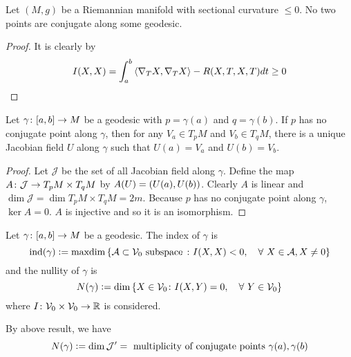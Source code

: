 \begin{enumerate}[label=\arabic{*}.]
	\begin{cor}
		Let $(M,g)$ be a Riemannian manifold with sectional curvature $\leq 0$. No two points are conjugate along some geodesic.
	\end{cor}
	\begin{proof}
		It is clearly by
		\begin{equation*}
			I(X,X) = \int_a^b \left\langle \nabla_TX,\nabla_T X \right\rangle - R(X,T,X,T)dt \geq 0
		\end{equation*}
	\end{proof}	
	\begin{lem}\label{lem:jacofixpt}
		Let $\gamma \colon [a,b] \rightarrow M$ be a geodesic with $p = \gamma(a)$ and $q = \gamma(b)$. If $p$ has no conjugate point along $\gamma$, then for any $V_a \in T_pM$ and $V_b \in T_qM$, there is a unique Jacobian field $U$ along $\gamma$ such that $U(a) = V_a$ and $U(b) = V_b$.
	\end{lem}
	\begin{proof}
		Let $\mathcal{J}$ be the set of all Jacobian field along $\gamma$. Define the map $A \colon \mathcal{J} \rightarrow T_pM \times T_qM$ by $A(U) = \left(U(a),U(b)\right)$. Clearly $A$ is linear and $\dim \mathcal{J} = \dim T_pM \times T_qM = 2m$. Because $p$ has no conjugate point along $\gamma$, $\ker A = 0$. $A$ is injective and so it is an isomorphism.
	\end{proof}

	\begin{defn}
		Let $\gamma \colon [a,b] \rightarrow M$ be a geodesic. The index of $\gamma$ is 
		\begin{equation*}
			\operatorname{ind}(\gamma) \vcentcolon= \operatorname{maxdim}\left\{\mathcal{A} \subset \mathcal{V}_0 \text{ subspace } \colon I(X,X) < 0,\quad \forall~X \in \mathcal{A},X\neq 0\right\}
		\end{equation*}
		and the nullity of $\gamma$ is
		\begin{equation*}
			N(\gamma) \vcentcolon= \dim \left\{X \in \mathcal{V}_0 \colon I(X,Y) = 0,\quad \forall~Y \in \mathcal{V}_0\right\}
		\end{equation*}
		where $I \colon \mathcal{V}_0 \times \mathcal{V}_0 \rightarrow \mathbb{R}$ is considered.
	\end{defn}
	\begin{rmk}
		By above result, we have
		\begin{equation*}
			N(\gamma) \vcentcolon= \dim \mathcal{J}^\prime = \text{ multiplicity of conjugate points }\gamma(a),\gamma(b)
		\end{equation*}
	\end{rmk}


\end{enumerate}

